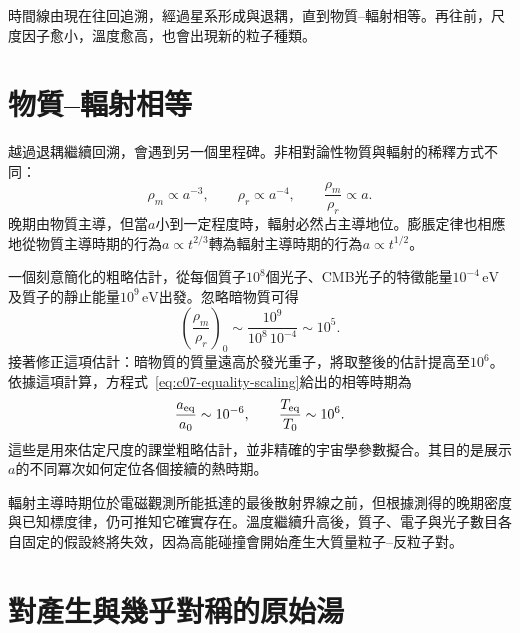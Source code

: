 時間線由現在往回追溯，經過星系形成與退耦，直到物質--輻射相等。再往前，尺度因子愈小，溫度愈高，也會出現新的粒子種類。

\section{物質--輻射相等}

越過退耦繼續回溯，會遇到另一個里程碑。非相對論性物質與輻射的稀釋方式不同：
\begin{equation}
\rho_m\propto a^{-3},
\qquad
\rho_r\propto a^{-4},
\qquad
\frac{\rho_m}{\rho_r}\propto a.
\label{eq:c07-equality-scaling}
\end{equation}
晚期由物質主導，但當\(a\)小到一定程度時，輻射必然占主導地位。膨脹定律也相應地從物質主導時期的行為\(a\propto t^{2/3}\)轉為輻射主導時期的行為\(a\propto t^{1/2}\)。

一個刻意簡化的粗略估計，從每個質子\(10^8\)個光子、CMB光子的特徵能量\(10^{-4}\,\mathrm{eV}\)及質子的靜止能量\(10^9\,\mathrm{eV}\)出發。忽略暗物質可得
\begin{equation}
\left(\frac{\rho_m}{\rho_r}\right)_0
\sim
\frac{10^9}{10^8\,10^{-4}}
\sim10^5.
\end{equation}
接著修正這項估計：暗物質的質量遠高於發光重子，將取整後的估計提高至\(10^6\)。依據這項計算，方程式~\eqref{eq:c07-equality-scaling}給出的相等時期為
\begin{equation}
\frac{a_{\rm eq}}{a_0}\sim10^{-6},
\qquad
\frac{T_{\rm eq}}{T_0}\sim10^6.
\label{eq:c07-equality-estimate}
\end{equation}
這些是用來估定尺度的課堂粗略估計，並非精確的宇宙學參數擬合。其目的是展示\(a\)的不同冪次如何定位各個接續的熱時期。

輻射主導時期位於電磁觀測所能抵達的最後散射界線之前，但根據測得的晚期密度與已知標度律，仍可推知它確實存在。溫度繼續升高後，質子、電子與光子數目各自固定的假設終將失效，因為高能碰撞會開始產生大質量粒子--反粒子對。

\begin{classroomqa}
\end{classroomqa}

\section{對產生與幾乎對稱的原始湯}

